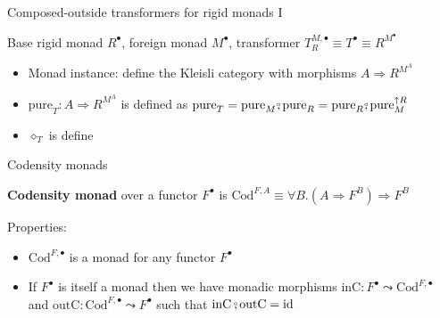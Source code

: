 \documentclass[english]{beamer}
\newcommand{\bef}{\ensuremath\raisebox{2pt}{$\mathsmaller{\mathsmaller{\circ}}$}\hspace{-3.3pt},}
\begin{document}
\begin{frame}{Composed-outside transformers for rigid monads I}

{\footnotesize{}\vspace{-0.15cm}}Base rigid monad $R^{\bullet}$,
foreign monad $M^{\bullet}$, transformer $T_{R}^{M,\bullet}\equiv T^{\bullet}\equiv R^{M^{\bullet}}$
\begin{itemize}
\item Monad instance: define the Kleisli category with morphisms $A\Rightarrow R^{M^{A}}$
\item $\text{pure}_{T}:A\Rightarrow R^{M^{A}}$ is defined as $\text{pure}_{T}=\text{pure}_{M}\bef\text{pure}_{R}=\text{pure}_{R}\bef\text{pure}_{M}^{\uparrow R}$
\item $\diamond_{T}$ is define
\end{itemize}
\end{frame}

\begin{frame}{Codensity monads}

\textbf{Codensity monad} over a functor $F^{\bullet}$ is $\text{Cod}^{F,A}\equiv\forall B.\left(A\Rightarrow F^{B}\right)\Rightarrow F^{B}$

Properties:
\begin{itemize}
\item $\text{Cod}^{F,\bullet}$ is a monad for any functor $F^{\bullet}$
\item If $F^{\bullet}$ is itself a monad then we have monadic morphisms
$\text{inC}:F^{\bullet}\leadsto\text{Cod}^{F,\bullet}$ and $\text{outC}:\text{Cod}^{F,\bullet}\leadsto F^{\bullet}$
such that $\text{inC}\,\bef\text{outC}=\text{id}$
\end{itemize}
\end{frame}
\end{document}
